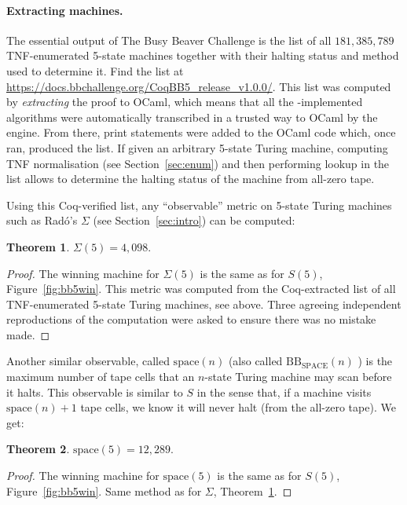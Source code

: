 \documentclass[a4paper,british]{article}
\theoremstyle{definition} %
\newtheorem{theorem}{Theorem}[section]
\numberwithin{equation}{section}
\theoremstyle{definition} %
\newcommand{\BBtheFifthTNF}{181{,}385{,}789}
\newcommand{\rado}{Rad\'o\xspace}
\begin{document}
\paragraph{Extracting machines.} The essential output of The Busy Beaver Challenge is the list of all $\BBtheFifthTNF$ TNF-enumerated 5-state machines together with their halting status and method used to determine it. Find the list at \url{https://docs.bbchallenge.org/CoqBB5_release_v1.0.0/}. This list was computed by \textit{extracting} the \Coq proof to OCaml, which means that all the \Coq-implemented algorithms were automatically transcribed  in a trusted way to OCaml by the \Coq engine. From there, print statements were added to the OCaml code which, once ran, produced the list. If given an arbitrary 5-state Turing machine, computing TNF normalisation (see Section~\ref{sec:enum}) and then performing lookup in the list allows to determine the halting status of the machine from all-zero tape.

Using this Coq-verified list, any ``observable'' metric on 5-state Turing machines such as \rado's $\Sigma$ (see Section~\ref{sec:intro}) can be computed:

\begin{theorem}\label{th:Sigma5}
    $\Sigma(5) = 4{,}098$.
\end{theorem}
\begin{proof}
    The winning machine for $\Sigma(5)$ is the same as for $S(5)$, Figure~\ref{fig:bb5win}.
    This metric was computed from the Coq-extracted list of all TNF-enumerated 5-state Turing machines, see above. Three agreeing independent reproductions of the computation were asked to ensure there was no mistake made.
\end{proof}

Another similar observable, called $\text{space}(n)$ \cite{Ben-Amram1996} (also called $\text{BB}_{\text{SPACE}}(n)$ \cite{sterin_2022_14955828}) is the maximum number of tape cells that an $n$-state Turing machine may scan before it halts. This observable is similar to $S$ in the sense that, if a machine visits $\text{space}(n)+1$ tape cells, we know it will never halt (from the all-zero tape). We get:

\begin{theorem}
    $\text{space}(5) = 12{,}289$.
\end{theorem}
\begin{proof}
    The winning machine for $\text{space}(5)$ is the same as for $S(5)$, Figure~\ref{fig:bb5win}.
    Same method as for $\Sigma$, Theorem~\ref{th:Sigma5}.
\end{proof}
\end{document}
